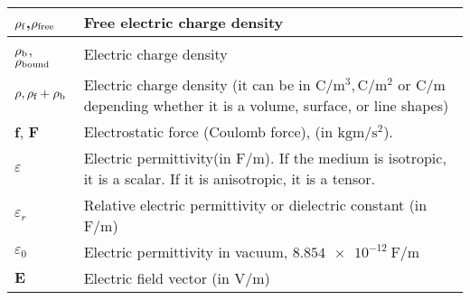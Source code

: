 \begin{xltabular}{\textwidth}{XX}
	\(\rho_\textnormal{f}\)\cite{wiki:electric-density-flux-sec:definition},\(\rho_{\textnormal{free}}\) \cite{wiki:D-field-flux}   & Free electric charge density                                                                                                                                                             \\ \hline
	\(\rho_\textnormal{b}\)\cite{wiki:electric-density-flux-sec:definition}, \(\rho_{\textnormal{bound}}\) \cite{wiki:D-field-flux} & Electric charge density                                                                                                                                                                  \\ \hline
	\(\rho, \rho_{\textnormal{f}}+\rho_{\textnormal{b}}\)                                                                           & Electric charge density (it can be in \(\si{\coulomb\per\meter^3}, \si{\coulomb\per\meter^2}\) or \(\si{\coulomb\per\meter}\) depending whether it is a volume, surface, or line shapes) \\ \hline
	\(\mathbf{f}\)\cite{ramoFieldsWavesCommunication1994}, \(\mathbf{F}\)\cite{wiki:coulomb-law}                                    & Electrostatic force (Coulomb force), (in \(\si{\kilo\gram\meter\per\second\squared}\)).                                                                                                  \\ \hline
	\(\varepsilon\)                                                                                                                 & Electric permittivity(in \(\si{\farad\per\meter}\)). If the medium is isotropic, it is a scalar. If it is anisotropic, it is a tensor. \cite{ramoFieldsWavesCommunication1994}           \\ \hline
	\(\varepsilon_r\)                                                                                                               & Relative electric permittivity or dielectric constant (in \(\si{\farad\per\meter}\)) \cite{ramoFieldsWavesCommunication1994}                                                             \\ \hline
	\(\varepsilon_0\)                                                                                                               & Electric permittivity in vacuum, \(\SI{8.854e-12}{\farad\per\meter}\) \cite{ramoFieldsWavesCommunication1994}                                                                            \\ \hline
	\(\mathbf{E}\)                                                                                                                  & Electric field vector (in \(\si{\volt\per\meter}\))                                                                                                                                      \\ \hline

\end{xltabular}
